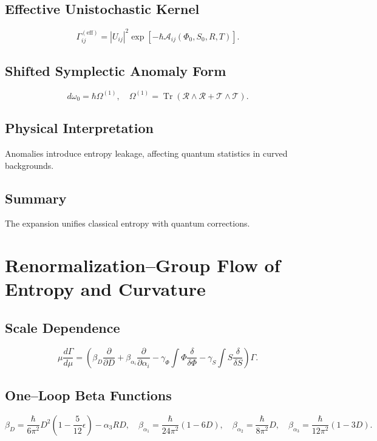 \documentclass[12pt]{article}
\begin{document}
\subsection{Effective Unistochastic Kernel}

\[
\Gamma_{ij}^{(\mathrm{eff})} = |U_{ij}|^2 \exp\left[ -\hbar \mathcal{A}_{ij}(\Phi_0, S_0, R, T) \right].
\]

\subsection{Shifted Symplectic Anomaly Form}

\[
d \omega_0 = \hbar \Omega^{(1)}, \quad \Omega^{(1)} = \operatorname{Tr} \left( \mathcal{R} \wedge \mathcal{R} + \mathcal{T} \wedge \mathcal{T} \right).
\]

\subsection{Physical Interpretation}

Anomalies introduce entropy leakage, affecting quantum statistics in curved backgrounds.

\subsection{Summary}

The expansion unifies classical entropy with quantum corrections.

\section{Renormalization–Group Flow of Entropy and Curvature}
\label{app:rg}

\subsection{Scale Dependence}

\[
\mu \frac{d \Gamma}{d \mu} = \left( \beta_D \frac{\partial}{\partial D} + \beta_{\alpha_i} \frac{\partial}{\partial \alpha_i} - \gamma_\Phi \int \Phi \frac{\delta}{\delta \Phi} - \gamma_S \int S \frac{\delta}{\delta S} \right) \Gamma.
\]

\subsection{One–Loop Beta Functions}

\[
\beta_D = \frac{\hbar}{6 \pi^2} D^2 \left(1 - \frac{5}{12} \epsilon \right) - \alpha_3 R D, \quad \beta_{\alpha_1} = \frac{\hbar}{24 \pi^2} (1 - 6D), \quad \beta_{\alpha_2} = \frac{\hbar}{8 \pi^2} D, \quad \beta_{\alpha_3} = \frac{\hbar}{12 \pi^2} (1 - 3D).
\]
\end{document}
